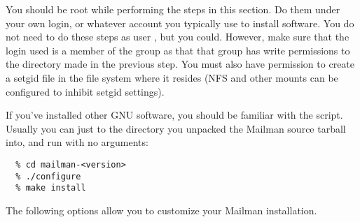 \documentclass{howto}
\begin{document}
You should  be root while performing the steps in this section.
Do them under your own login, or whatever account you typically use to install
software.  You do not need to do these steps as user , but you
could.  However, make sure that the login used is a member of the
 group as that that group has write permissions to the
 directory made in the previous step.  You must also have
permission to create a setgid file in the file system where it resides (NFS
and other mounts can be configured to inhibit setgid settings).

If you've installed other GNU software, you should be familiar with the
 script.  Usually you can just  to the
directory you unpacked the Mailman source tarball into, and run
 with no arguments:

\begin{verbatim}
  % cd mailman-<version>
  % ./configure
  % make install
\end{verbatim}

The following options allow you to customize your Mailman
installation.
\end{document}
